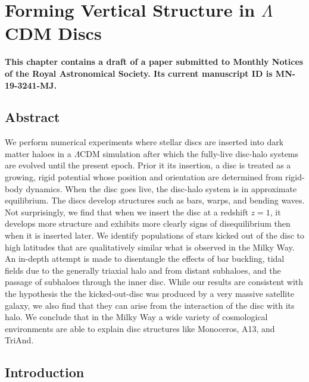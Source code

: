 
\newcommand{\kpch}{\ensuremath{h^{-1} \, \text{kpc}}}
\newcommand{\kpc}{\ensuremath{\text{kpc}}}
\newcommand{\solarmh}{\ensuremath{h^{-1} \, M_\odot}}
\newcommand{\solarm}{M_\odot}
\chapter{Forming Vertical Structure in $\Lambda$CDM Discs}\label{ch:paper_iii}
\textbf{This chapter contains a draft of a paper submitted to Monthly Notices of the Royal Astronomical Society. Its current manuscript ID is MN-19-3241-MJ.}

\newpage
\section{Abstract}

We perform numerical experiments where stellar discs are inserted into
dark matter haloes in a $\Lambda$CDM simulation after which the
fully-live disc-halo systems are evolved until the present epoch. {Prior it its insertion, a disc is treated as a growing, rigid potential whose position and orientation are determined from rigid-body dynamics. When the disc goes live, the disc-halo system is in approximate equilibrium.} The
discs develop structures such as bars, warps, and bending waves.  Not
surprisingly, we find that when we insert the disc at a redshift
$z=1$, it develops more structure and exhibits more clearly signs of
disequilibrium then when it is inserted later.  We identify
populations of stars kicked out of the disc to high latitudes that are
qualitatively similar what is observed in the Milky Way. {An in-depth attempt is made to disentangle the effects of bar buckling, tidal fields due to 
the generally triaxial halo and from distant subhaloes, and the
passage of subhaloes through the inner disc. }While our
results are consistent with the hypothesis the the kicked-out-disc was
produced by a very massive satellite galaxy, we also find that they
can arise from the interaction of the disc with its halo. We conclude
that in the Milky Way a wide variety of cosmological environments are
able to explain disc structures like Monoceros, A13, and TriAnd.




\section{Introduction} \label{sec:introduction}

